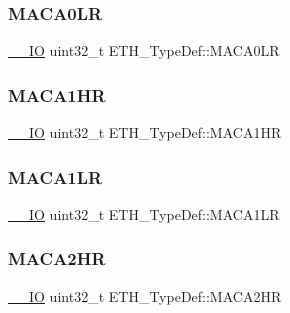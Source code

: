 \mbox{\label{struct_e_t_h___type_def_a9c939e1e21924c888ee2c31dee9e810a}} 
\subsubsection{\texorpdfstring{MACA0LR}{MACA0LR}}
{\footnotesize\ttfamily \mbox{\hyperlink{group___c_m_s_i_s___c_m3__core__definitions_gaec43007d9998a0a0e01faede4133d6be}{\+\_\+\+\_\+\+IO}} uint32\+\_\+t E\+T\+H\+\_\+\+Type\+Def\+::\+M\+A\+C\+A0\+LR}

\mbox{\label{struct_e_t_h___type_def_a8f7f8cbf64bf3ce73a6d25ca019ca712}} 
\subsubsection{\texorpdfstring{MACA1HR}{MACA1HR}}
{\footnotesize\ttfamily \mbox{\hyperlink{group___c_m_s_i_s___c_m3__core__definitions_gaec43007d9998a0a0e01faede4133d6be}{\+\_\+\+\_\+\+IO}} uint32\+\_\+t E\+T\+H\+\_\+\+Type\+Def\+::\+M\+A\+C\+A1\+HR}

\mbox{\label{struct_e_t_h___type_def_ad0b7882917068bd398d4d8e209794ead}} 
\subsubsection{\texorpdfstring{MACA1LR}{MACA1LR}}
{\footnotesize\ttfamily \mbox{\hyperlink{group___c_m_s_i_s___c_m3__core__definitions_gaec43007d9998a0a0e01faede4133d6be}{\+\_\+\+\_\+\+IO}} uint32\+\_\+t E\+T\+H\+\_\+\+Type\+Def\+::\+M\+A\+C\+A1\+LR}

\mbox{\label{struct_e_t_h___type_def_a1ad00033d223abb9075df5bf38894445}} 
\subsubsection{\texorpdfstring{MACA2HR}{MACA2HR}}
{\footnotesize\ttfamily \mbox{\hyperlink{group___c_m_s_i_s___c_m3__core__definitions_gaec43007d9998a0a0e01faede4133d6be}{\+\_\+\+\_\+\+IO}} uint32\+\_\+t E\+T\+H\+\_\+\+Type\+Def\+::\+M\+A\+C\+A2\+HR}

